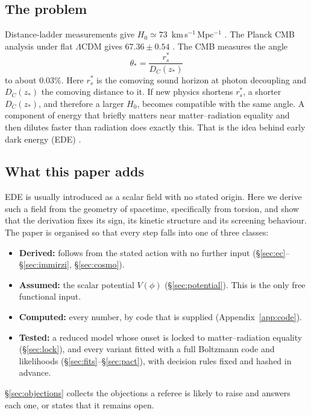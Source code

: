 \documentclass[11pt]{article}
\begin{document}
\subsection{The problem}
Distance-ladder measurements give $H_0\simeq73$~km\,s$^{-1}$\,Mpc$^{-1}$
\cite{riess2022}. The Planck CMB analysis under flat $\Lambda$CDM gives
$67.36\pm0.54$ \cite{planck2020}. The CMB measures the angle
\begin{equation}
\theta_*=\frac{r_s^*}{D_C(z_*)}
\end{equation}
to about $0.03\%$. Here $r_s^*$ is the comoving sound horizon at photon decoupling and
$D_C(z_*)$ the comoving distance to it. If new physics shortens $r_s^*$, a shorter
$D_C(z_*)$, and therefore a larger $H_0$, becomes compatible with the same angle. A
component of energy that briefly matters near matter--radiation equality and then
dilutes faster than radiation does exactly this. That is the idea behind early dark
energy (EDE) \cite{karwal2016,poulin2019}.

\subsection{What this paper adds}
EDE is usually introduced as a scalar field with no stated origin. Here we derive such a
field from the geometry of spacetime, specifically from torsion, and show that the
derivation fixes its sign, its kinetic structure and its screening behaviour. The paper
is organised so that every step falls into one of three classes:
\begin{itemize}
\item \textbf{Derived:} follows from the stated action with no further input
(\S\ref{sec:ec}--\S\ref{sec:immirzi}, \S\ref{sec:cosmo}).
\item \textbf{Assumed:} the scalar potential $V(\phi)$ (\S\ref{sec:potential}). This is the
only free functional input.
\item \textbf{Computed:} every number, by code that is supplied (Appendix~\ref{app:code}).
\item \textbf{Tested:} a reduced model whose onset is locked to matter--radiation equality
(\S\ref{sec:lock}), and every variant fitted with a full Boltzmann code and likelihoods
(\S\ref{sec:fits}--\S\ref{sec:pact}), with decision rules fixed and hashed in advance.
\end{itemize}
\S\ref{sec:objections} collects the objections a referee is likely to raise and answers
each one, or states that it remains open.
\end{document}
